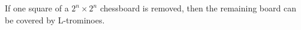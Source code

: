 If one square of a $2^n \times 2^n$ chessboard is removed, then the remaining board can be covered by L-trominoes.

